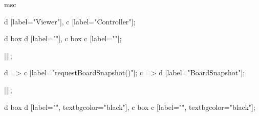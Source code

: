 \begin{msc}
msc {

d [label="Viewer"],
c [label="Controller"];

d box d [label=""],
c box c [label=""];


|||;

d => c [label="requestBoardSnapshot()"];
c => d [label="BoardSnapshot"];

|||;

d box d [label="", textbgcolor="black"],
c box c [label="", textbgcolor="black"];

}
\end{msc}
